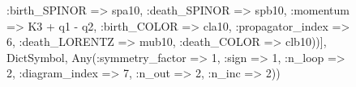 \documentclass{revtex4}
\begin{document}
\begin{figure}[!htb]
\begin{center}
{:birth_SPINOR => spa10, :death_SPINOR => spb10, :momentum => K3 + q1 - q2, :birth_COLOR => cla10, :propagator_index => 6, :death_LORENTZ => mub10, :death_COLOR => clb10))], Dict{Symbol, Any}(:symmetry_factor => 1, :sign => 1, :n_loop => 2, :diagram_index => 7, :n_out => 2, :n_inc => 2)) 
}
\end{center}
\end{figure}
\end{document}

